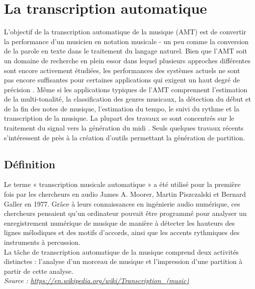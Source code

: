 \section{La transcription automatique}
L'objectif de la transcription automatique de la musique (AMT) \cite{article1} est de convertir la performance d'un musicien en notation musicale - un peu comme la conversion de la parole en texte dans le traitement du langage naturel. Bien que l’AMT soit un domaine de recherche en plein essor dans lequel plusieurs approches différentes sont encore activement étudiées, les performances des systèmes actuels ne sont pas encore suffisantes pour certaines applications qui exigent un haut degré de précision \cite{article1}. Même si les applications typiques de l'AMT comprennent l'estimation de la multi-tonalité, la classification des genres musicaux, la détection du début et de la fin des notes de musique, l'estimation du tempo, le suivi du rythme et la transcription de la musique. La plupart des travaux se sont concentrés sur le traitement du signal vers la génération du midi \cite{article2}. Seuls quelques travaux récents \cite{foscarin:hal-01988990} s’intéressent de près à la création d’outils permettant la génération de partition.
\subsection*{Définition}
Le terme « transcription musicale automatique » a été utilisé pour la première fois par les chercheurs en audio James A. Moorer, Martin Piszczalski et Bernard Galler en 1977. Grâce à leurs connaissances en ingénierie audio numérique, ces chercheurs pensaient qu'un ordinateur pouvait être programmé pour analyser un enregistrement numérique de musique de manière à détecter les hauteurs des lignes mélodiques et des motifs d'accords, ainsi que les accents rythmiques des instruments à percussion.\\La tâche de transcription automatique de la musique comprend deux activités distinctes : l'analyse d'un morceau de musique et l'impression d'une partition à partir de cette analyse.\\
\textit{Source : \url{https://en.wikipedia.org/wiki/Transcription_(music)}}

